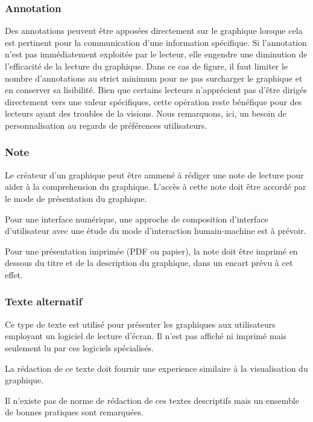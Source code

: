 \documentclass[a4paper,12pt]{article}
\begin{document}
\begin{multicols}{2}
\subsubsection*{Annotation}
\label{sec:orge2558aa}
Des annotations peuvent être apposées directement sur le graphique lorsque cela est pertinent pour la communication d'une information spécifique. Si l'annotation n'est pas immédiatement exploitée par le lecteur, elle engendre une diminution de l'efficacité de la lecture du graphique. \autocite{tranDiscoveringAccessibleData2024} Dans ce cas de figure, il faut limiter le nombre d'annotations au strict minimum pour ne pas surcharger le graphique et en conserver sa lisibilité. \autocite{stephenfewComponentlevelGraphDesign2012} Bien que certains lecteurs n'apprécient pas d'être dirigés directement vers une valeur spécifiques,\autocite{tranDiscoveringAccessibleData2024} cette opération reste bénéfique pour des lecteurs ayant des troubles de la visions. \autocite{dougschepersDesigningDataCognitive2022} Nous remarquons, ici, un besoin de personnalisation au regards de préférences utilisateurs.
\subsubsection*{Note}
\label{sec:org0988b80}
Le créateur d'un graphique peut être ammené à rédiger une note de lecture pour aider à la comprehension du graphique. L'accès à cette note doit être accordé par le mode de présentation du graphique. \autocite{jonathanschwabishDevelopingDataVisualization2021}

Pour une interface numérique, une approche de composition d'interface d'utilisateur avec une étude du mode d'interaction humain-machine est à prévoir.

Pour une présentation imprimée (PDF ou papier), la note doit être imprimé en dessous du titre et de la description du graphique, dans un encart prévu à cet effet.
\subsubsection*{Texte alternatif}
\label{sec:org5478b54}
Ce type de texte est utilisé pour présenter les graphiques aux utilisateurs employant un logiciel de lecture d'écran. Il n'est pas affiché ni imprimé mais seulement lu par ces logiciels spécialisés.

La rédaction de ce texte doit fournir une experience similaire à la visualisation du graphique.

Il n'existe pas de norme de rédaction de ces textes descriptifs mais un ensemble de bonnes pratiques sont remarquées.


\end{multicols}
\end{document}
